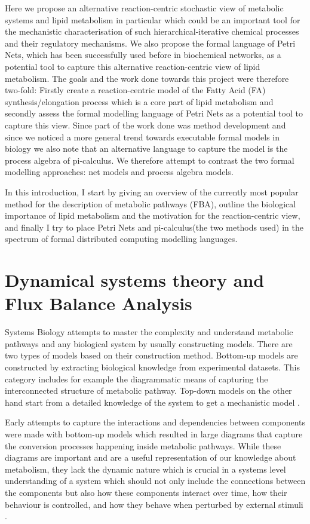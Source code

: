 Here we propose an alternative reaction-centric stochastic view of metabolic
systems and lipid metabolism in particular which could be an important
tool for the mechanistic characterisation of such
hierarchical-iterative chemical processes and their regulatory
mechanisms. 
We also propose the formal language of Petri
Nets, which has been successfully used before in biochemical networks,
as a potential tool to capture this alternative reaction-centric view
of lipid metabolism. The goals and the work done towards this project were therefore two-fold:
Firstly create a reaction-centric model of the Fatty Acid (FA)
synthesis/elongation process which is a core part of lipid
metabolism and secondly assess the formal modelling language of Petri
Nets as a potential tool to capture this view. Since part of the work
done was method development and since we noticed a more
general trend towards executable formal models in biology \cite [] {fisher2007executable} we also
note that an alternative language to capture the model is the process
algebra of  pi-calculus. We therefore attempt to contrast the two formal
modelling approaches: net models and process algebra models.

In this introduction, I start by giving an overview of the currently most popular
method for the description of metabolic pathways (FBA),
outline the biological importance of lipid metabolism and the
motivation for the reaction-centric view, and finally I try to place
Petri Nets and pi-calculus(the two methods used) in the spectrum
of formal
distributed computing modelling languages.

\section{Dynamical systems theory and Flux Balance Analysis}
Systems Biology attempts to master the complexity and understand metabolic
pathways and any biological system by usually constructing
models. There are two types of models based on their construction
method. Bottom-up models are constructed by extracting biological
knowledge from experimental datasets. This category includes for
example the diagrammatic means of capturing the interconnected
structure of metabolic pathway. Top-down models on the other hand
start from a detailed knowledge of the system to get a mechanistic
model \cite [] {schneider2013understanding}.

Early attempts to capture the interactions and dependencies between
components were made with bottom-up models which resulted in large diagrams that
capture the conversion processes happening inside metabolic pathways. While these
diagrams are important and are a useful representation of our knowledge
about metabolism, they lack the dynamic nature which is crucial in a
systems level understanding of a system which should not only include
the connections between the components but also how these components
interact over time, how their behaviour is
controlled, and how they behave when perturbed by external stimuli \cite [] {kitano2002systems}.

